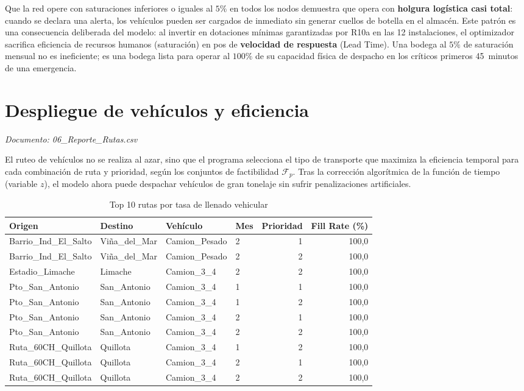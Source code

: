 \documentclass[letterpaper]{article}
\begin{document}
Que la red opere con saturaciones inferiores o iguales al $5\%$ en todos los nodos
demuestra que opera con \textbf{holgura logística casi total}: cuando se
declara una alerta, los vehículos pueden ser cargados de inmediato sin generar
cuellos de botella en el almacén. Este patrón es una consecuencia deliberada del
modelo: al invertir en dotaciones mínimas garantizadas por R10a en las 12
instalaciones, el optimizador sacrifica eficiencia de recursos humanos (saturación) en pos de
\textbf{velocidad de respuesta} (Lead Time). Una bodega al $5\%$ de saturación mensual no es
ineficiente; es una bodega lista para operar al $100\%$ de su capacidad física de
despacho en los críticos primeros 45~minutos de una emergencia.

\section{Despliegue de vehículos y eficiencia}

\textit{Documento: 06\_Reporte\_Rutas.csv}

El ruteo de vehículos no se realiza al azar, sino que el programa selecciona el
tipo de transporte que maximiza la eficiencia temporal para cada combinación de
ruta y prioridad, según los conjuntos de factibilidad $\mathcal{F}_p$. Tras la corrección algorítmica de la función de tiempo (variable $z$), el modelo ahora puede despachar vehículos de gran tonelaje sin sufrir penalizaciones artificiales.

\begin{table}[H]
\centering
\caption{Top 10 rutas por tasa de llenado vehicular}
\label{tab:rutas}
\begin{tabular}{llllrr}
\hline
\textbf{Origen} & \textbf{Destino} & \textbf{Vehículo} & \textbf{Mes} & \textbf{Prioridad} & \textbf{Fill Rate (\%)} \\
\hline
Barrio\_Ind\_El\_Salto   & Viña\_del\_Mar & Camion\_Pesado &  2 & 1 & 100{,}0 \\
Barrio\_Ind\_El\_Salto   & Viña\_del\_Mar & Camion\_Pesado &  2 & 2 & 100{,}0 \\
Estadio\_Limache         & Limache        & Camion\_3\_4   &  2 & 2 & 100{,}0 \\
Pto\_San\_Antonio        & San\_Antonio   & Camion\_3\_4   &  1 & 1 & 100{,}0 \\
Pto\_San\_Antonio        & San\_Antonio   & Camion\_3\_4   &  1 & 2 & 100{,}0 \\
Pto\_San\_Antonio        & San\_Antonio   & Camion\_3\_4   &  2 & 1 & 100{,}0 \\
Pto\_San\_Antonio        & San\_Antonio   & Camion\_3\_4   &  2 & 2 & 100{,}0 \\
Ruta\_60CH\_Quillota     & Quillota       & Camion\_3\_4   &  1 & 2 & 100{,}0 \\
Ruta\_60CH\_Quillota     & Quillota       & Camion\_3\_4   &  2 & 1 & 100{,}0 \\
Ruta\_60CH\_Quillota     & Quillota       & Camion\_3\_4   &  2 & 2 & 100{,}0 \\
\hline
\end{tabular}
\end{table}
\end{document}

